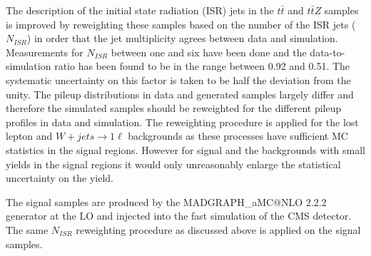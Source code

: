 The description of the initial state radiation (ISR) jets in the $t\bar{t}$ and $t\bar{t}Z$ samples is improved by reweighting these samples based on the number of the ISR jets ($N_{ISR}$) in order that the jet multiplicity agrees between data and simulation. Measurements for  $N_{ISR}$ between one and six have been done and the data-to-simulation ratio has been  found to be in the range between 0.92 and 0.51. The systematic uncertainty on this factor is taken to be half the deviation from the unity. The  pileup distributions in data and  generated samples largely differ and therefore the simulated samples should be reweighted for the different pileup profiles in data and simulation. The reweighting procedure is applied for the lost lepton and $W+jets \to 1\ell$ backgrounds as these processes have sufficient MC statistics in the signal regions. However for signal and the backgrounds with small yields in the signal regions it would only unreasonably enlarge the statistical uncertainty on the yield. 

The signal samples are produced by the MADGRAPH\_aMC@NLO 2.2.2 generator at the LO and injected into the fast simulation of the CMS detector.  The same $N_{ISR}$ reweighting procedure as discussed above is applied on the signal samples. 

